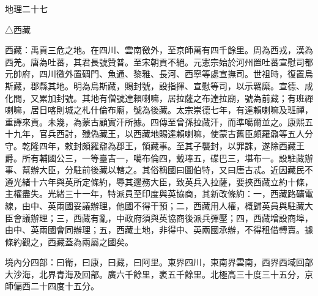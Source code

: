 
\begin{pinyinscope}
地理二十七

△西藏

西藏：禹貢三危之地。在四川、雲南徼外，至京師萬有四千餘里。周為西戎，漢為西羌。唐為吐蕃，其君長號贊普。至宋朝貢不絕。元憲宗始於河州置吐蕃宣慰司都元帥府，四川徼外置碉門、魚通、黎雅、長河、西寧等處宣撫司。世祖時，復置烏斯藏，郡縣其地。明為烏斯藏，賜封號，設指揮、宣慰等司，以示羈縻。宣德、成化間，又累加封號。其地有僧號達賴喇嘛，居拉薩之布達拉廟，號為前藏；有班禪喇嘛，居日喀則城之札什倫布廟，號為後藏。太宗崇德七年，有達賴喇嘛及班禪，重譯來貢。未幾，為蒙古顧實汗所據。四傳至曾孫拉藏汗，而準噶爾並之。康熙五十九年，官兵西討，殲偽藏王，以西藏地賜達賴喇嘛，使蒙古舊臣頗羅鼐等五人分守。乾隆四年，敕封頗羅鼐為郡王，領藏事。至其子襲封，以罪誅，遂除西藏王爵。所有輔國公三，一等臺吉一，噶布倫四，戴琫五，碟巴三，堪布一。設駐藏辦事、幫辦大臣，分駐前後藏以轄之。其俗稱國曰圖伯特，又曰唐古忒。近因藏民不遵光緒十六年與英所定條約，辱其邊務大臣，致英兵入拉薩，要挾西藏立約十條，主權盡失。光緒三十一年，特派員至印度與英協商，其新改條約：一，西藏路礦電線，由中、英兩國妥議辦理，他國不得干預；二，西藏用人權，概歸英員與駐藏大臣會議辦理；三，西藏有亂，中政府須與英協商後派兵彈壓；四，西藏增設商埠，由中、英兩國會同辦理；五，西藏土地，非得中、英兩國承辦，不得租借轉賣。據條約觀之，西藏蓋為兩屬之國矣。

境內分四部：曰衛，曰康，曰藏，曰阿里。東界四川，東南界雲南，西界西域回部大沙海，北界青海及回部。廣六千餘里，袤五千餘里。北極高三十度三十五分，京師偏西二十四度十五分。


\end{pinyinscope}
